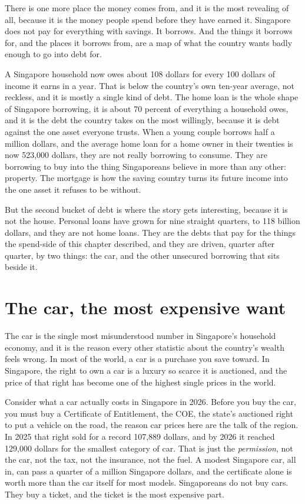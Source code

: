\documentclass[10pt,twoside,openany]{memoir}
\newcommand{\needspacehead}{\needspace{4\baselineskip}}
\let\oldsection\section
\renewcommand{\section}{\needspacehead\oldsection}
\begin{document}
{{{{{{{{{{{{{{{{{There is one more place the money comes from, and it is the most
revealing of all, because it is the money people spend before they have
earned it. Singapore does not pay for everything with savings. It
borrows. And the things it borrows for, and the places it borrows from,
are a map of what the country wants badly enough to go into debt for.

A Singapore household now owes about 108 dollars for every 100 dollars
of income it earns in a year. That is below the country's own ten-year
average, not reckless, and it is mostly a single kind of debt. The home
loan is the whole shape of Singapore borrowing, it is about 70 percent
of everything a household owes, and it is the debt the country takes on
the most willingly, because it is debt against the one asset everyone
trusts. When a young couple borrows half a million dollars, and the
average home loan for a home owner in their twenties is now 523,000
dollars, they are not really borrowing to consume. They are borrowing to
buy into the thing Singaporeans believe in more than any other:
property. The mortgage is how the saving country turns its future income
into the one asset it refuses to be without.

But the second bucket of debt is where the story gets interesting,
because it is not the house. Personal loans have grown for nine straight
quarters, to 118 billion dollars, and they are not home loans. They are
the debts that pay for the things the spend-side of this chapter
described, and they are driven, quarter after quarter, by two things:
the car, and the other unsecured borrowing that sits beside it.

\section{The car, the most expensive
want}\label{the-car-the-most-expensive-want}

The car is the single most misunderstood number in Singapore's household
economy, and it is the reason every other statistic about the country's
wealth feels wrong. In most of the world, a car is a purchase you save
toward. In Singapore, the right to own a car is a luxury so scarce it is
auctioned, and the price of that right has become one of the highest
single prices in the world.

Consider what a car actually costs in Singapore in 2026. Before you buy
the car, you must buy a Certificate of Entitlement, the COE, the state's
auctioned right to put a vehicle on the road, the reason car prices here
are the talk of the region. In 2025 that right sold for a record 107,889
dollars, and by 2026 it reached 129,000 dollars for the smallest
category of car. That is just the \emph{permission}, not the car, not
the tax, not the insurance, not the fuel. A modest Singapore car, all
in, can pass a quarter of a million Singapore dollars, and the
certificate alone is worth more than the car itself for most models.
Singaporeans do not buy cars. They buy a ticket, and the ticket is the
most expensive part.

}}}}}}}}}}}}}}}}}
\end{document}
